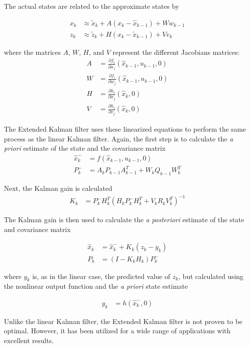 The actual states are related to the approximate states by

\begin{align}
x_k &\approx\tilde{x}_k+A(x_k-\hat{x}_{k-1})+Ww_{k-1}\\
z_k &\approx\tilde{z}_k+H(x_k-\tilde{x}_{k-1})+Vv_k
\end{align}

where  the matrices $A$, $W$, $H$, and $V$ represent the different Jacobians matrices:
\begin{align}
A &= \frac{\partial f_i}{\partial x_j}(\hat{x}_{k-1},u_{k-1},0)\\
W &= \frac{\partial f_i}{\partial w_j}(\hat{x}_{k-1},u_{k-1},0)\\
H &= \frac{\partial h_i}{\partial x_j}(\hat{x}_{k},0)\\
V &= \frac{\partial h_i}{\partial v_j}(\hat{x}_{k},0)
\end{align}

The Extended Kalman filter uses these linearized equations to perform the same process as the linear Kalman filter. Again, the first step is to calculate the \textit{a priori} estimate of the state and the covariance matrix
\begin{align}
\hat{x}^-_k &=f(\hat{x}_{k-1},u_{k-1},0)\\
P^-_k  &= A_kP_{k-1}A^T_{k-1}+W_kQ_{k-1}W^T_k
\end{align}

Next, the Kalman gain is calculated
\begin{align}
K_k &=P^-_kH^T_k(H_kP^-_kH^T_k+V_kR_kV^T_k)^{-1}
\end{align}

The Kalman gain is then used to calculate the \textit{a posteriori} estimate of the state and covariance matrix

\begin{align}
\hat{x}_k &=\hat{x}^-_{k}+K_k(z_k-y_k)\\
\label{kalmanVariance}
P_k &=(I-K_kH_k)P^-_k
\end{align}

where $y_k$ is, as in the linear case, the predicted value of $z_k$, but calculated using the nonlinear output function and the \textit{a priori} state estimate

\begin{align}
y_k &= h(\hat{x}^-_k,0)
\end{align}

Unlike the linear Kalman filter, the Extended Kalman filter is not proven to be optimal. However, it has been utilized for a wide range of applications with excellent results.
